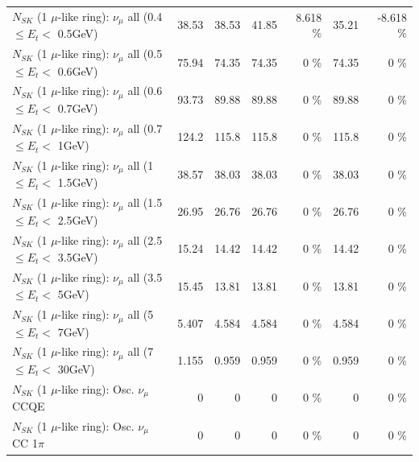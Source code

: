 \begin{table}
\begin{tabular}{| l | r | r | r  r | r  r |}
       $N_{SK}$ (1 $\mu$-like ring): $\nu_{\mu}$ all (0.4 $\leq E_{t} <$ 0.5GeV) &           38.53 &           38.53 &           41.85 &    8.618 \%  &           35.21 &   -8.618 \%  \\ 
       $N_{SK}$ (1 $\mu$-like ring): $\nu_{\mu}$ all (0.5 $\leq E_{t} <$ 0.6GeV) &           75.94 &           74.35 &           74.35 &        0 \%  &           74.35 &        0 \%  \\ 
       $N_{SK}$ (1 $\mu$-like ring): $\nu_{\mu}$ all (0.6 $\leq E_{t} <$ 0.7GeV) &           93.73 &           89.88 &           89.88 &        0 \%  &           89.88 &        0 \%  \\ 
         $N_{SK}$ (1 $\mu$-like ring): $\nu_{\mu}$ all (0.7 $\leq E_{t} <$ 1GeV) &           124.2 &           115.8 &           115.8 &        0 \%  &           115.8 &        0 \%  \\ 
         $N_{SK}$ (1 $\mu$-like ring): $\nu_{\mu}$ all (1 $\leq E_{t} <$ 1.5GeV) &           38.57 &           38.03 &           38.03 &        0 \%  &           38.03 &        0 \%  \\ 
       $N_{SK}$ (1 $\mu$-like ring): $\nu_{\mu}$ all (1.5 $\leq E_{t} <$ 2.5GeV) &           26.95 &           26.76 &           26.76 &        0 \%  &           26.76 &        0 \%  \\ 
       $N_{SK}$ (1 $\mu$-like ring): $\nu_{\mu}$ all (2.5 $\leq E_{t} <$ 3.5GeV) &           15.24 &           14.42 &           14.42 &        0 \%  &           14.42 &        0 \%  \\ 
         $N_{SK}$ (1 $\mu$-like ring): $\nu_{\mu}$ all (3.5 $\leq E_{t} <$ 5GeV) &           15.45 &           13.81 &           13.81 &        0 \%  &           13.81 &        0 \%  \\ 
           $N_{SK}$ (1 $\mu$-like ring): $\nu_{\mu}$ all (5 $\leq E_{t} <$ 7GeV) &           5.407 &           4.584 &           4.584 &        0 \%  &           4.584 &        0 \%  \\ 
          $N_{SK}$ (1 $\mu$-like ring): $\nu_{\mu}$ all (7 $\leq E_{t} <$ 30GeV) &           1.155 &           0.959 &           0.959 &        0 \%  &           0.959 &        0 \%  \\ 
\hline
\hline
                               $N_{SK}$ (1 $\mu$-like ring): Osc. $\nu_\mu$ CCQE &               0 &               0 &               0 &        0 \%  &               0 &        0 \%  \\ 
                          $N_{SK}$ (1 $\mu$-like ring): Osc. $\nu_\mu$ CC 1$\pi$ &               0 &               0 &               0 &        0 \%  &               0 &        0 \%  \\ 

\end{tabular}
\end{table}
